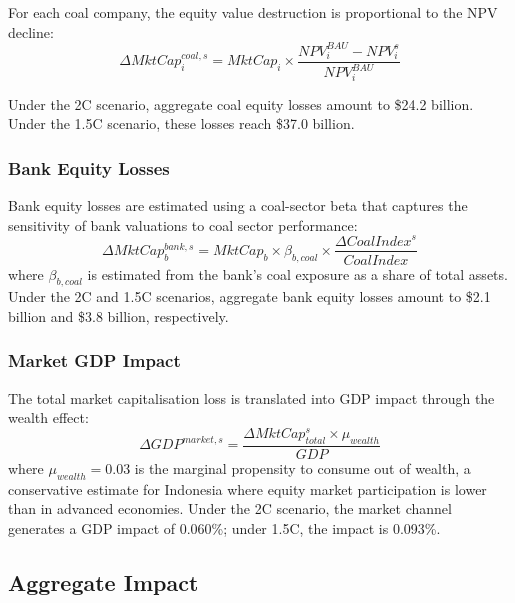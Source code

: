 For each coal company, the equity value destruction is proportional to the NPV decline:
\begin{equation}
\label{eq:coal_mktcap}
\Delta MktCap_i^{coal,s} = MktCap_i \times \frac{NPV_i^{BAU} - NPV_i^s}{NPV_i^{BAU}}
\end{equation}

Under the 2\textdegree C scenario, aggregate coal equity losses amount to \$24.2 billion. Under the 1.5\textdegree C scenario, these losses reach \$37.0 billion.

\subsubsection{Bank Equity Losses}

Bank equity losses are estimated using a coal-sector beta that captures the sensitivity of bank valuations to coal sector performance:
\begin{equation}
\label{eq:bank_mktcap}
\Delta MktCap_b^{bank,s} = MktCap_b \times \beta_{b,coal} \times \frac{\Delta CoalIndex^s}{CoalIndex}
\end{equation}
where $\beta_{b,coal}$ is estimated from the bank's coal exposure as a share of total assets. Under the 2\textdegree C and 1.5\textdegree C scenarios, aggregate bank equity losses amount to \$2.1 billion and \$3.8 billion, respectively.

\subsubsection{Market GDP Impact}

The total market capitalisation loss is translated into GDP impact through the wealth effect:
\begin{equation}
\label{eq:market_gdp}
\Delta GDP^{market,s} = \frac{\Delta MktCap_{total}^s \times \mu_{wealth}}{GDP}
\end{equation}
where $\mu_{wealth} = 0.03$ is the marginal propensity to consume out of wealth, a conservative estimate for Indonesia where equity market participation is lower than in advanced economies. Under the 2\textdegree C scenario, the market channel generates a GDP impact of 0.060\%; under 1.5\textdegree C, the impact is 0.093\%.

\subsection{Aggregate Impact}
\label{subsec:aggregate_impact}

